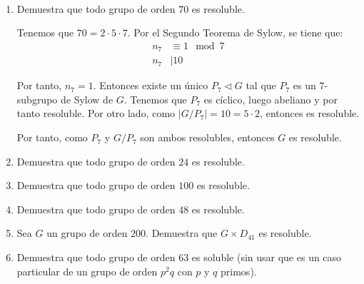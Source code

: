 \begin{ejercicio}~
    \begin{enumerate}
        \item Demuestra que todo grupo de orden $70$ es resoluble.
        
        Tenemos que $70=2\cdot 5\cdot 7$. Por el Segundo Teorema de Sylow, se tiene que:
        \begin{align*}
            n_7 &\equiv 1 \mod 7 \\
            n_7 &\mid 10
        \end{align*}

        Por tanto, $n_7=1$. Entonces existe un único $P_7\lhd G$ tal que $P_7$ es un $7$-subgrupo de Sylow de $G$. Tenemos que $P_7$ es cíclico, luego abeliano y por tanto resoluble. Por otro lado, como $|G/P_7|=10=5\cdot 2$, entonces es resoluble.

        Por tanto, como $P_7$ y $G/P_7$ son ambos resolubles, entonces $G$ es resoluble.
        \item Demuestra que todo grupo de orden $24$ es resoluble.
        \item Demuestra que todo grupo de orden $100$ es resoluble.
        \item Demuestra que todo grupo de orden $48$ es resoluble.
        \item Sea $G$ un grupo de orden $200$. Demuestra que $G \times D_{41}$ es resoluble.
        \item Demuestra que todo grupo de orden $63$ es soluble (sin usar que es un caso particular de un grupo de orden $p^2q$ con $p$ y $q$ primos).
    \end{enumerate}

\end{ejercicio}
